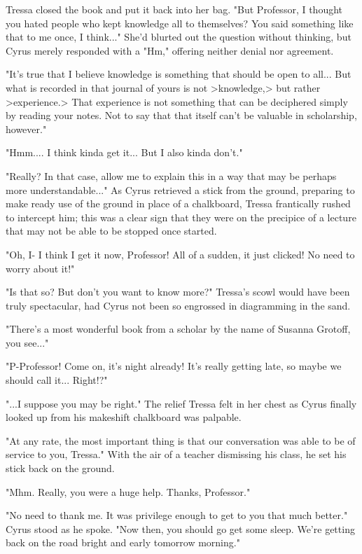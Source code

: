 Tressa closed the book and put it back into her bag. "But Professor, I thought you hated people who kept knowledge all to themselves? You said something like that to me once, I think..." She'd blurted out the question without thinking, but Cyrus merely responded with a "Hm," offering neither denial nor agreement. 

"It's true that I believe knowledge is something that should be open to all... But what is recorded in that journal of yours is not >knowledge,> but rather >experience.> That experience is not something that can be deciphered simply by reading your notes. Not to say that that itself can't be valuable in scholarship, however."

"Hmm.... I think kinda get it... But I also kinda don't."

"Really? In that case, allow me to explain this in a way that may be perhaps more understandable..." As Cyrus retrieved a stick from the ground, preparing to make ready use of the ground in place of a chalkboard, Tressa frantically rushed to intercept him; this was a clear sign that they were on the precipice of a lecture that may not be able to be stopped once started.

"Oh, I- I think I get it now, Professor! All of a sudden, it just clicked! No need to worry about it!"

"Is that so? But don't you want to know more?" Tressa's scowl would have been truly spectacular, had Cyrus not been so engrossed in diagramming in the sand.

"There's a most wonderful book from a scholar by the name of Susanna Grotoff, you see..."

"P-Professor! Come on, it's night already! It's really getting late, so maybe we should call it... Right!?"

"...I suppose you may be right." The relief Tressa felt in her chest as Cyrus finally looked up from his makeshift chalkboard was palpable.

"At any rate, the most important thing is that our conversation was able to be of service to you, Tressa." With the air of a teacher dismissing his class, he set his stick back on the ground.

"Mhm. Really, you were a huge help. Thanks, Professor."

"No need to thank me. It was privilege enough to get to you that much better." Cyrus stood as he spoke. "Now then, you should go get some sleep. We're getting back on the road bright and early tomorrow morning."

